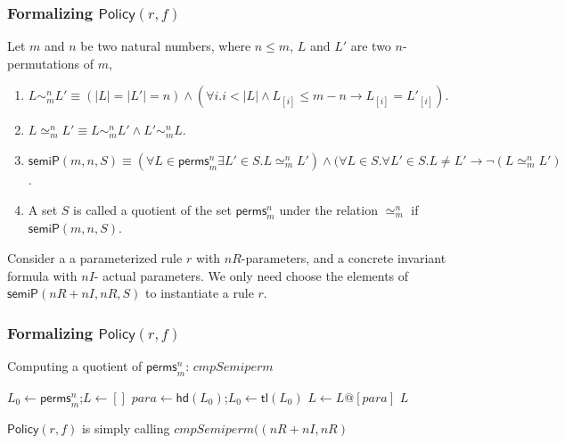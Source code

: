 \documentclass{beamer}
\begin{document}
 \begin{frame}\frametitle{Formalizing $\mathsf{Policy}(r,f)$}

Let $m$ and $n$ be two natural numbers, where $n \le m$,  $L$ and $L'$ are  two  $n$-permutations of $m$,
\begin{enumerate}%
\item
$L \sim_m^n L' \equiv (|L| =|L'|=n) \wedge (\forall i. i<|L| \wedge L_{[i]} \le m-n \longrightarrow L_{[i]}=L'_{[i]}) $.

\item $L \simeq_m^n L' \equiv L \sim_m^n L' \wedge   L' \sim_m^n L$.


\item $\mathsf{semiP}(m,n,S)\equiv (\forall  L \in \mathsf{perms}_{m}^{n} \exists  L' \in S. L \simeq_m^n L' ) \wedge (\forall  L\in S. \forall L'\in S. L \neq L' \longrightarrow \neg  (L \simeq_m^n L' )$.

\item    A set $S$ is called a quotient of the set $\mathsf{perms}_{m}^{n}$ under the relation $\simeq_m^n$ if    $\mathsf{semiP}(m,n,S)$.
\end{enumerate}

Consider a a parameterized rule $r$ with $nR$-parameters, and a concrete invariant formula with $nI$- actual parameters. We only need choose the elements of $\mathsf{semiP}(nR+nI,nR,S)$ to instantiate a rule $r$.

\end{frame}

\begin{frame}\frametitle{Formalizing $\mathsf{Policy}(r,f)$}
\begin{algorithm}[H]
\caption{Computing a quotient of $\mathsf{perms}_{m}^{n}$: $cmpSemiperm$ \label{alg:computeSemiPerms}}%



{
    $L_0\leftarrow \mathsf{perms}_m^n$;$L\leftarrow [] $\;
      {$para \leftarrow \mathsf{hd}(L_0)$;$L_0 \leftarrow \mathsf{tl}(L_0)$\;
        { $L\leftarrow L@[para]$\;}
      }
    \Return $L$\;
}


\end{algorithm}
$\mathsf{Policy}(r,f)$ is simply calling  $cmpSemiperm((nR+nI,nR)$
\end{frame}
\end{document}
